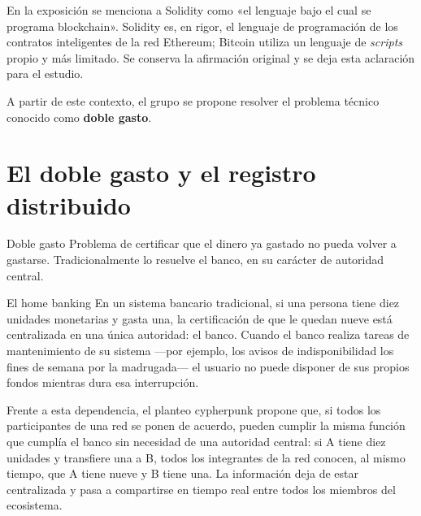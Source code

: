 \documentclass[12pt,oneside]{book}
\begin{document}
\begin{note}
En la exposición se menciona a Solidity como «el lenguaje bajo el cual se programa blockchain». Solidity es, en rigor, el lenguaje de programación de los contratos inteligentes de la red Ethereum; Bitcoin utiliza un lenguaje de \textit{scripts} propio y más limitado. Se conserva la afirmación original y se deja esta aclaración para el estudio.
\end{note}

A partir de este contexto, el grupo se propone resolver el problema técnico conocido como \textbf{doble gasto}.

\section{El doble gasto y el registro distribuido}

\begin{definition}{Doble gasto}
Problema de certificar que el dinero ya gastado no pueda volver a gastarse. Tradicionalmente lo resuelve el banco, en su carácter de autoridad central.
\end{definition}

\begin{example}{El home banking}
En un sistema bancario tradicional, si una persona tiene diez unidades monetarias y gasta una, la certificación de que le quedan nueve está centralizada en una única autoridad: el banco. Cuando el banco realiza tareas de mantenimiento de su sistema —por ejemplo, los avisos de indisponibilidad los fines de semana por la madrugada— el usuario no puede disponer de sus propios fondos mientras dura esa interrupción.
\end{example}

Frente a esta dependencia, el planteo cypherpunk propone que, si todos los participantes de una red se ponen de acuerdo, pueden cumplir la misma función que cumplía el banco sin necesidad de una autoridad central: si A tiene diez unidades y transfiere una a B, todos los integrantes de la red conocen, al mismo tiempo, que A tiene nueve y B tiene una. La información deja de estar centralizada y pasa a compartirse en tiempo real entre todos los miembros del ecosistema.
\end{document}
